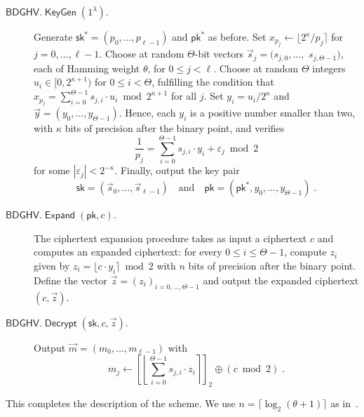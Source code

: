 \documentclass{llncs}
\renewcommand\leq\leqslant
\newcommand{\abs}[1]{\left|#1\right|}
\DeclareMathOperator{\KeyGen}{\ensuremath{\mathsf{KeyGen}}}
\DeclareMathOperator{\Expand}{\ensuremath{\mathsf{Expand}}}
\DeclareMathOperator{\Decrypt}{\ensuremath{\mathsf{Decrypt}}}
\newcommand*{\pk}{\ensuremath{\mathsf{pk}}}
\newcommand*{\sk}{\ensuremath{\mathsf{sk}}}
\newcommand*{\BDGHV}{\ensuremath{\mathsf{BDGHV}}}
\newcommand\ignore[1]{}
\begin{document}
\begin{description}
\item[$\BDGHV.\KeyGen(1^\lambda)$.] Generate
  $\sk^*=(p_0,\ldots,p_{\ell-1})$ and $\pk^*$ as before. Set $x_{p_j}
  \leftarrow \lfloor 2^\kappa/p_j\rceil$ for
  $j=0,\ldots,{\ell-1}$. Choose at random 
  $\Theta$-bit vectors $\vec s_j=(s_{j,0},\ldots,$ $s_{j,\Theta-1})$,
  each of Hamming weight $\theta$, for $0 \leq j < \ell$.
Choose at random $\Theta$ integers $u_i\in[0, 2^{\kappa+1})$ for $0
  \leq i <\Theta$, fulfilling the condition that
$
x_{p_j}=\sum_{i=0}^{\Theta-1}
s_{j,i} \cdot u_{i} \bmod 2^{\kappa+1}$ for all $j$.
Set $y_i=u_i/2^\kappa$ and $\vec y=(y_0,\ldots,y_{\Theta-1})$. Hence,
each $y_i$ is a positive number smaller than two, with $\kappa$ bits
of precision after the binary point, and verifies 
\begin{equation}
\label{eqpj}
\frac{1}{p_j}=\sum_{i=0}^{\Theta-1}
s_{j,i} \cdot y_{i} + \varepsilon_j \bmod 2
\end{equation}
for some $\abs{\varepsilon_j}<2^{-\kappa}$. Finally, output the key pair
$$\sk=(\vec s_0,\ldots,\vec s_{\ell-1}) \quad \text{and} \quad \pk = (\pk^*, y_0, \ldots, y_{\Theta-1})\;.$$
\item[$\BDGHV.\Expand(\pk, c)$.] The ciphertext expansion procedure takes
  as input a ciphertext $c$ and computes an expanded
  ciphertext: for every $0\leq i\leq \Theta-1$, compute $z_i$ given by
$ z_i = \lfloor c\cdot y_i\rceil \bmod 2 $
with $n$ bits of precision after the binary point. Define the vector $\vec z=(z_i)_{i=0,\ldots,\Theta-1}$ and output the expanded ciphertext $(c, \vec z)$.
\\\vspace{-0.25cm}
\item[$\BDGHV.\Decrypt(\sk, c, \vec z)$.] Output $\vec
  m=(m_0,\ldots,m_{\ell-1})$ with 
\begin{equation}
\label{eq:decrypt}
m_j \leftarrow\left[\left\lfloor\sum_{i=0}^{\Theta-1}
s_{j,i} \cdot z_{i}\right\rceil\right]_2 \oplus
(c \bmod 2)\;. 
\end{equation}
\end{description}
This completes the description of the scheme. 
We
use $n=\lceil \log_2 (\theta+1) \rceil$ as in~\cite{CMNT2011}.\ignore{; the
proof of the following Lemma is  the same as in~\cite[Appendix~E]{CMNT2011}.

\begin{lemma}The BDGHV encryption scheme is correct for the set $C(\mathcal {P_E})$ of
  circuits that compute permitted polynomials.\end{lemma} 

\begin{remark}
To reduce the size of the public key we can generate all the $y_i$'s
pseudo-randomly as in~\cite{CMNT2011},  
except $\ell$ of them in order to satisfy Equation~\eqref{eqpj} for
all $0 \leq j < \ell$.
\end{remark}
}
\end{document}
